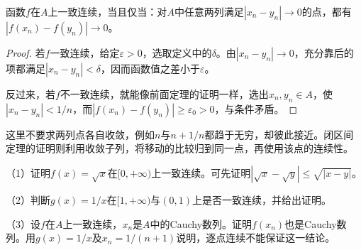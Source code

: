\begin{proposition}\label{prop:functions-uniform-continuity-sequences}
函数\(f\)在\(A\)上一致连续，当且仅当：对\(A\)中任意两列满足\(|x_n-y_n|\to0\)的点，都有\(|f(x_n)-f(y_n)|\to0\)。
\end{proposition}

\begin{proof}
若\(f\)一致连续，给定\(\varepsilon>0\)，选取定义中的\(\delta\)。由\(|x_n-y_n|\to0\)，充分靠后的项都满足\(|x_n-y_n|<\delta\)，因而函数值之差小于\(\varepsilon\)。

反过来，若\(f\)不一致连续，就能像前面定理的证明一样，选出\(x_n,y_n\in A\)，使\(|x_n-y_n|<1/n\)，而\(|f(x_n)-f(y_n)|\ge\varepsilon_0>0\)，与条件矛盾。
\end{proof}

这里不要求两列点各自收敛，例如\(n\)与\(n+1/n\)都趋于无穷，却彼此接近。闭区间定理的证明则利用收敛子列，将移动的比较归到同一点，再使用该点的连续性。

\begin{exercise}
\mbox{}\par\nobreak

（1）证明\(f(x)=\sqrt x\)在\([0,+\infty)\)上一致连续。可先证明\(|\sqrt x-\sqrt y|\le\sqrt{|x-y|}\)。

（2）判断\(g(x)=1/x\)在\([1,+\infty)\)与\((0,1)\)上是否一致连续，并给出证明。

（3）设\(f\)在\(A\)上一致连续，\(x_n\)是\(A\)中的Cauchy数列。证明\(f(x_n)\)也是Cauchy数列。用\(g(x)=1/x\)及\(x_n=1/(n+1)\)说明，逐点连续不能保证这一结论。
\end{exercise}

